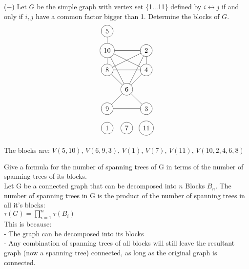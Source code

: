 \documentclass[12pt]{article}
\newenvironment{question}[2][Question]{\begin{trivlist}
\item[\hskip \labelsep {\bfseries #1}\hskip \labelsep {\bfseries #2.}]}{\end{trivlist}}
\begin{document}
\begin{question}{4}
($-$) Let $G$ be the simple graph with vertex set \{1...11\} defined by $i \leftrightarrow j$ if and only if $i, j$ have a common factor bigger than 1.  Determine the blocks of $G$.
\begin{align*}
\begin{tikzpicture}
\node[shape=circle,draw=black] (A) at (0,5) {5};
\node[shape=circle,draw=black] (B) at (0,4) {10};
\node[shape=circle,draw=black] (C) at (2,4) {2};
\node[shape=circle,draw=black] (D) at (0,3) {8};
\node[shape=circle,draw=black] (E) at (2,3) {4};
\node[shape=circle,draw=black] (F) at (1,2) {6};
\node[shape=circle,draw=black] (G) at (0,1) {9};
\node[shape=circle,draw=black] (H) at (2,1) {3};
\node[shape=circle,draw=black] (I) at (0,0) {1};
\node[shape=circle,draw=black] (I) at (1,0) {7};
\node[shape=circle,draw=black] (I) at (2,0) {11};
\path [] (A) edge node[left] {} (B);
\path [] (B) edge node[left] {} (C);
\path [] (B) edge node[left] {} (D);
\path [] (B) edge node[left] {} (E);
\path [] (B) edge node[left] {} (F);
\path [] (C) edge node[left] {} (D);
\path [] (C) edge node[left] {} (E);
\path [] (C) edge node[left] {} (F);
\path [] (D) edge node[left] {} (E);
\path [] (D) edge node[left] {} (F);
\path [] (E) edge node[left] {} (F);
\path [] (F) edge node[left] {} (G);
\path [] (F) edge node[left] {} (H);
\path [] (G) edge node[left] {} (H);
\end{tikzpicture}
\end{align*}

The blocks are: $V(5, 10) $, $V(6,9,3)$, $V(1)$, $V(7)$, $V(11)$, $V(10,2,4,6,8)$
\end{question}

\begin{question}{5}
	Give a formula for the number of spanning trees of G in terms of the number of spanning trees of its blocks.	\\
	Let G be a connected graph that can be decomposed into $n$ Blocks $B_n$. The number of spanning trees in G is the product of the number of spanning trees in all it's blocks: \\

	$\tau(G) = \prod_{i=1}^{n}\tau(B_i)$\\
	This is because:\\
	- The graph can be decomposed into its blocks\\
	- Any combination of spanning trees of all blocks will still leave the resultant graph (now a spanning tree) connected, as long as the original graph is connected.
\end{question}
\end{document}
